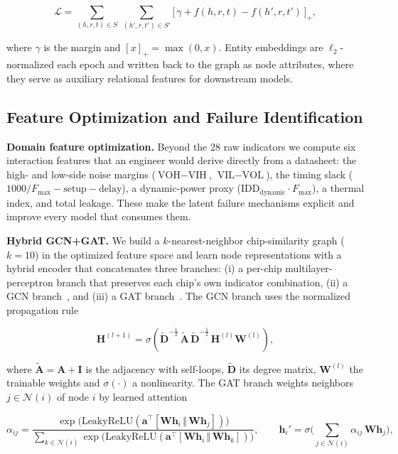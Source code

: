 \documentclass[electronics,article,submit,pdftex,moreauthors]{Definitions/mdpi}
\begin{document}
\begin{equation}
\mathcal{L} = \sum_{(h,r,t)\in S}\ \sum_{(h',r,t')\in S'}\big[\, \gamma + f(h,r,t) - f(h',r,t') \,\big]_{+},
\label{eq:transe-loss}
\end{equation}

where $\gamma$ is the margin and $[x]_{+}=\max(0,x)$. Entity embeddings are $\ell_2$-normalized each epoch and written back to the graph as node attributes, where they serve as auxiliary relational features for downstream models.

\subsection{Feature Optimization and Failure Identification}\label{sec:fe}
\textbf{Domain feature optimization.} Beyond the 28 raw indicators we compute six interaction features that an engineer would derive directly from a datasheet: the high- and low-side noise margins ($\text{VOH}-\text{VIH}$, $\text{VIL}-\text{VOL}$), the timing slack ($1000/F_{\max}-\text{setup}-\text{delay}$), a dynamic-power proxy ($\text{IDD}_{\text{dynamic}}\cdot F_{\max}$), a thermal index, and total leakage. These make the latent failure mechanisms explicit and improve every model that consumes them.

\textbf{Hybrid GCN+GAT.} We build a $k$-nearest-neighbor chip-similarity graph ($k{=}10$) in the optimized feature space and learn node representations with a hybrid encoder that concatenates three branches: (i) a per-chip multilayer-perceptron branch that preserves each chip's own indicator combination, (ii) a GCN branch~\cite{kipf2017semi}, and (iii) a GAT branch~\cite{velickovic2018graph}. The GCN branch uses the normalized propagation rule

\begin{equation}
\mathbf{H}^{(l+1)} = \sigma\!\left(\tilde{\mathbf{D}}^{-\frac12}\,\tilde{\mathbf{A}}\,\tilde{\mathbf{D}}^{-\frac12}\,\mathbf{H}^{(l)}\mathbf{W}^{(l)}\right),
\label{eq:gcn}
\end{equation}

where $\tilde{\mathbf{A}}=\mathbf{A}+\mathbf{I}$ is the adjacency with self-loops, $\tilde{\mathbf{D}}$ its degree matrix, $\mathbf{W}^{(l)}$ the trainable weights and $\sigma(\cdot)$ a nonlinearity. The GAT branch weights neighbors $j\in\mathcal{N}(i)$ of node $i$ by learned attention

\begin{equation}
\alpha_{ij} = \frac{\exp\!\big(\mathrm{LeakyReLU}(\mathbf{a}^{\top}[\mathbf{W}\mathbf{h}_i \,\Vert\, \mathbf{W}\mathbf{h}_j])\big)}{\sum_{k\in\mathcal{N}(i)}\exp\!\big(\mathrm{LeakyReLU}(\mathbf{a}^{\top}[\mathbf{W}\mathbf{h}_i \,\Vert\, \mathbf{W}\mathbf{h}_k])\big)},\qquad
\mathbf{h}_i' = \sigma\!\Big(\sum_{j\in\mathcal{N}(i)}\alpha_{ij}\,\mathbf{W}\mathbf{h}_j\Big),
\label{eq:gat}
\end{equation}
\end{document}

